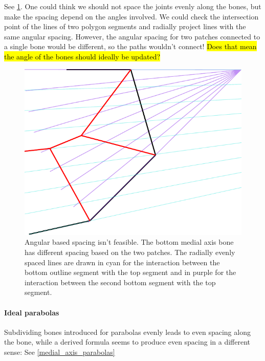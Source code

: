 See \cref{angular_based_spacing}.
One could think we should not space the joints evenly along the bones, but make the spacing depend on the angles involved.
We could check the intersection point of the lines of two polygon segments and radially project lines with the same angular spacing.
However, the angular spacing for two patches connected to a single bone would be different, so the paths wouldn't connect!
\hl{Does that mean the angle of the bones should ideally be updated?}


\begin{figure}
\centering
\includegraphics[width=.5\columnwidth]{sources/method/angular_based_spacing.pdf}
\caption{Angular based spacing isn't feasible. The bottom medial axis bone has different spacing based on the two patches. The radially evenly spaced lines are drawn in cyan for the interaction between the bottom outline segment with the top segment and in purple for the interaction between the second bottom segment with  the top segment.}
\label{angular_based_spacing}
\end{figure}


\paragraph{Ideal parabolas}
Subdividing bones introduced for parabolas evenly leads to even spacing along the bone,
while a derived formula seems to produce even spacing in a different sense:
See \cref{medial_axis_parabolas}


